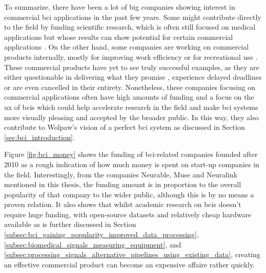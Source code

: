 To summarize, there have been a lot of big companies showing interest in commercial \gls{bci} applications in the past few years.
Some might contribute directly to the field by funding scientific research, which is often still focused on medical applications but whose results can show potential for certain commercial applications \citep{facebook_bci_blog, facebook_bci_keyboard, neuralink_whitepaper}.
On the other hand, some companies are working on commercial products internally, mostly for improving work efficiency \citep{fb_building8, bci_nude_detection} or for recreational use \citep[Muse and InteraXon headband,][]{valve_bci_interest}.
These commercial products have yet to see truly successful examples, as they are either questionable in delivering what they promise \citep{interaxon_tests}, experience delayed deadlines or are even cancelled in their entirety.
Nonetheless, these companies focusing on commercial applications often have high amounts of funding and a focus on the \gls{ux} of \glspl{bci} which could help accelerate research in the field and make \gls{bci} systems more visually pleasing and accepted by the broader public.
In this way, they also contribute to Wolpaw's vision of a perfect \gls{bci} system as discussed in Section \ref{sec:bci_introduction}.

Figure \ref{fig:bci_money} shows the funding of \gls{bci}-related companies founded after 2010 as a rough indication of how much money is spent on start-up companies in the field.
Interestingly, from the companies Neurable, Muse and Neuralink mentioned in this thesis, the funding amount is in proportion to the overall popularity of that company to the wider public, although this is by no means a proven relation.
It also shows that whilst academic research on \glspl{bci} doesn't require huge funding, with open-source datasets and relatively cheap hardware available as is further discussed in Section \ref{subsec:bci_gaining_popularity_improved_data_processing}, \ref{subsec:biomedical_signals_measuring_equipment}, and \ref{subsec:processing_signals_alternative_pipelines_using_existing_data}, creating an effective commercial product can become an expensive affaire rather quickly.

